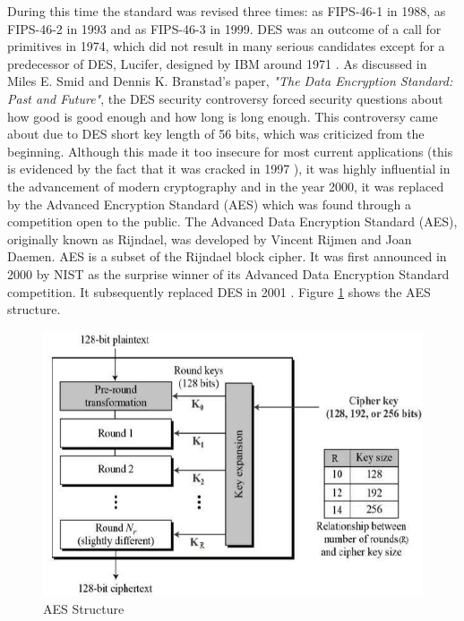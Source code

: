 \documentclass[journal]{IEEEtran}
\begin{document}
During this time the standard was revised three times: as FIPS-46-1 in 1988, as FIPS-46-2 in 1993 and as FIPS-46-3 in 1999. DES was an outcome of a call for primitives in 1974, which did not result in many serious candidates except for a predecessor of DES, Lucifer, designed by IBM around 1971 \cite{DES}. As discussed in Miles E. Smid and Dennis K. Branstad's paper, \textit{"The Data Encryption Standard: Past and Future"}, the DES security controversy \cite{DES_past&future} forced security questions about how good is good enough and how long is long enough. This controversy came about due to DES short key length of 56 bits, which was criticized from the beginning. Although this made it too insecure for most current applications (this is evidenced by the fact that it was cracked in 1997 \cite{des_cracked}), it was highly influential in the advancement of modern cryptography \cite{des_overview} and in the year 2000, it was replaced by the Advanced Encryption Standard (AES) which was found through a competition open to the public.
\newline\newline
The Advanced Data Encryption Standard (AES), originally known as Rijndael, was developed by Vincent Rijmen and Joan Daemen. AES is a subset of the Rijndael block cipher. It was first announced in 2000 by NIST as the surprise winner \cite{AES} of its Advanced Data Encryption Standard competition. It subsequently replaced DES in 2001 \cite{Encryption_Study}. Figure \ref{fig:aes} shows the AES structure.

\newline
\begin{figure}[!h]
    \centering
    \includegraphics[scale=.267]{aes_structure}
    \caption{AES Structure}
    \label{fig:aes}
\end{figure}
\end{document}
